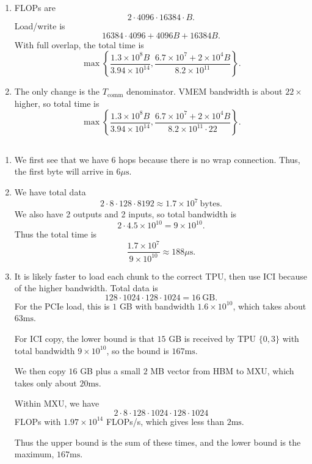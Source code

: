 \documentclass[11pt]{article}
\newcommand{\B}{B}
\newcommand{\bytes}{\mathrm{bytes}}
\newcommand{\us}{\mu\mathrm{s}}
\newcommand{\ms}{\mathrm{ms}}
\newcommand{\exercisebreak}{\Needspace{8\baselineskip}}
\begin{document}
\exercisebreak
\subsection{}
\begin{enumerate}
  \item FLOPs are
  \[
    2\cdot 4096\cdot 16384\cdot \B.
  \]
  Load/write is
  \[
    16384\cdot 4096 + 4096\B + 16384\B.
  \]
  With full overlap, the total time is
  \[
    \max\left\{
      \frac{1.3\times 10^8\B}{3.94\times 10^{14}},
      \frac{6.7\times 10^7+2\times 10^4\B}{8.2\times 10^{11}}
    \right\}.
  \]

  \item The only change is the $T_{\mathrm{comm}}$ denominator. VMEM bandwidth is about $22\times$ higher, so total time is
  \[
    \max\left\{
      \frac{1.3\times 10^8\B}{3.94\times 10^{14}},
      \frac{6.7\times 10^7+2\times 10^4\B}{8.2\times 10^{11}\cdot 22}
    \right\}.
  \]
\end{enumerate}

\exercisebreak
\subsection{}
\begin{enumerate}
  \item We first see that we have 6 hops because there is no wrap connection. Thus, the first byte will arrive in $6\us$.

  \item We have total data
  \[
    2\cdot 8\cdot 128\cdot 8192\approx 1.7\times 10^7\ \bytes.
  \]
  We also have 2 outputs and 2 inputs, so total bandwidth is
  \[
    2\cdot 4.5\times 10^{10}=9\times 10^{10}.
  \]
  Thus the total time is
  \[
    \frac{1.7\times 10^7}{9\times 10^{10}}\approx 188\us.
  \]

  \item It is likely faster to load each chunk to the correct TPU, then use ICI because of the higher bandwidth. Total data is
  \[
    128\cdot 1024\cdot 128\cdot 1024 = 16\ \mathrm{GB}.
  \]
  For the PCIe load, this is $1$ GB with bandwidth $1.6\times 10^{10}$, which takes about $63\ms$.

  For ICI copy, the lower bound is that $15$ GB is received by TPU $\{0,3\}$ with total bandwidth $9\times 10^{10}$, so the bound is $167\ms$.

  We then copy $16$ GB plus a small $2$ MB vector from HBM to MXU, which takes only about $20\ms$.

  Within MXU, we have
  \[
    2\cdot 8\cdot 128\cdot 1024\cdot 128\cdot 1024
  \]
  FLOPs with $1.97\times 10^{14}$ FLOPs/s, which gives less than $2\ms$.

  Thus the upper bound is the sum of these times, and the lower bound is the maximum, $167\ms$.
\end{enumerate}
\end{document}
